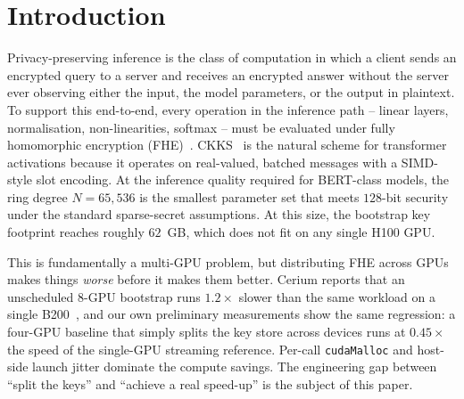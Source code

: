 \documentclass[conference]{IEEEtran}
\begin{document}
\section{Introduction}

Privacy-preserving inference is the class of computation in which a
client sends an encrypted query to a server and receives an encrypted
answer without the server ever observing either the input, the model
parameters, or the output in plaintext. To support this end-to-end,
every operation in the inference path -- linear layers, normalisation,
non-linearities, softmax -- must be evaluated under fully homomorphic
encryption (FHE)~\cite{gentry2009fully}. CKKS~\cite{Cheon2017} is the
natural scheme for transformer activations because it operates on
real-valued, batched messages with a SIMD-style slot
encoding. At the inference quality required for BERT-class models, the
ring degree $N{=}65{,}536$ is the smallest parameter set that meets
$128$-bit security under the standard sparse-secret assumptions. At
this size, the bootstrap key footprint reaches roughly $62$~GB, which
does not fit on any single H100 GPU.

This is fundamentally a multi-GPU problem, but distributing FHE across
GPUs makes things \emph{worse} before it makes them better. Cerium
reports that an unscheduled $8$-GPU bootstrap runs $1.2\times$ slower
than the same workload on a single
B200~\cite{Jayashankar2025-arxiv}, and our own preliminary
measurements show the same regression: a four-GPU baseline that simply
splits the key store across devices runs at $0.45\times$ the speed of
the single-GPU streaming reference. Per-call \texttt{cudaMalloc} and
host-side launch jitter dominate the compute savings. The engineering
gap between ``split the keys'' and ``achieve a real speed-up'' is the
subject of this paper.
\end{document}
